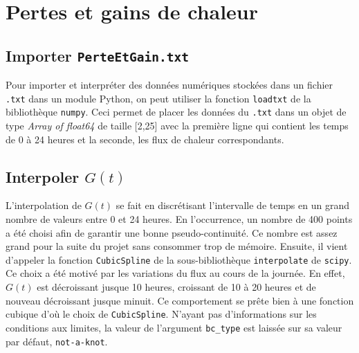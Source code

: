 \documentclass[12pt]{article}
\begin{document}
\section{Pertes et gains de chaleur}
    \subsection{Importer \texttt{PerteEtGain.txt}}
        Pour importer et interpréter des données numériques stockées dans un fichier \texttt{.txt} dans un module Python, on peut utiliser la fonction \texttt{loadtxt} de la bibliothèque \texttt{numpy}. Ceci permet de placer les données du \texttt{.txt} dans un objet de type \textit{Array of float64} de taille [2,25] avec la première ligne qui contient les temps de 0 à 24 heures et la seconde, les flux de chaleur correspondants.
    \subsection{Interpoler $G(t)$}
        L'interpolation de $G(t)$ se fait en discrétisant l'intervalle de temps en un grand nombre de valeurs entre 0 et 24 heures. En l'occurrence, un nombre de 400 points a été choisi afin de garantir une bonne pseudo-continuité. Ce nombre est assez grand pour la suite du projet sans consommer trop de mémoire. Ensuite, il vient d'appeler la fonction \texttt{CubicSpline} de la sous-bibliothèque \texttt{interpolate} de \texttt{scipy}. Ce choix a été motivé par les variations du flux au cours de la journée. En effet, $G(t)$ est décroissant jusque 10 heures, croissant de 10 à 20 heures et de nouveau décroissant jusque minuit. Ce comportement se prête bien à une fonction cubique d'où le choix de \texttt{CubicSpline}. N'ayant pas d'informations sur les conditions aux limites, la valeur de l'argument \texttt{bc\_type} est laissée sur sa valeur par défaut, \texttt{not-a-knot}.
\end{document}
